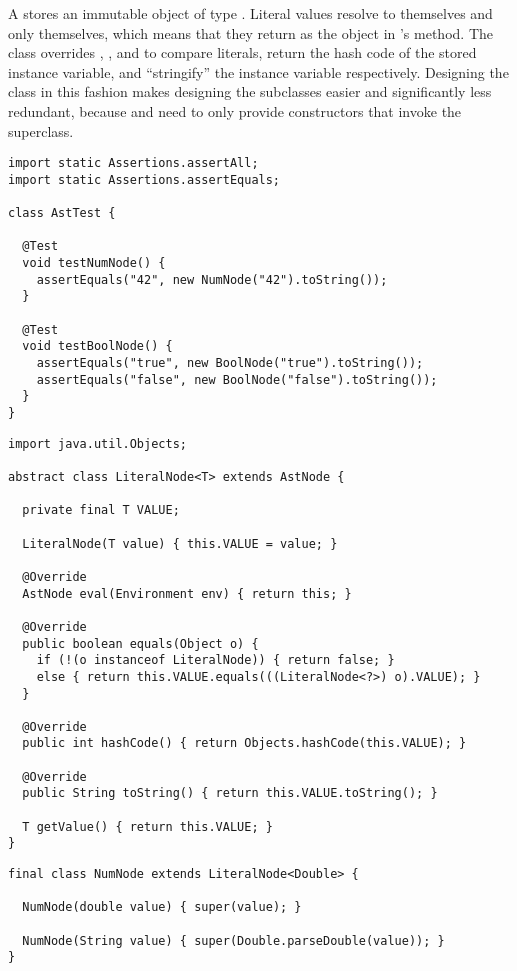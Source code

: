 A  stores an immutable object of type .
Literal values resolve to themselves and only themselves, which means that they return  as the object in 's  method.
The  class overrides , , and  to compare literals, return the hash code of the stored instance variable, and ``stringify'' the instance variable respectively.
Designing the  class in this fashion makes designing the subclasses easier and significantly less redundant, because  and  need to only provide constructors that invoke the superclass.

\enlargethispage{-5\baselineskip}
\begin{lstlisting}[language=MyJava]
import static Assertions.assertAll;
import static Assertions.assertEquals;

class AstTest {

  @Test
  void testNumNode() {
    assertEquals("42", new NumNode("42").toString());
  }

  @Test
  void testBoolNode() {
    assertEquals("true", new BoolNode("true").toString());
    assertEquals("false", new BoolNode("false").toString());
  }  
}
\end{lstlisting}

\begin{lstlisting}[language=MyJava]
import java.util.Objects;

abstract class LiteralNode<T> extends AstNode {

  private final T VALUE;

  LiteralNode(T value) { this.VALUE = value; }

  @Override
  AstNode eval(Environment env) { return this; }

  @Override
  public boolean equals(Object o) {
    if (!(o instanceof LiteralNode)) { return false; } 
    else { return this.VALUE.equals(((LiteralNode<?>) o).VALUE); }
  }

  @Override
  public int hashCode() { return Objects.hashCode(this.VALUE); }

  @Override
  public String toString() { return this.VALUE.toString(); }

  T getValue() { return this.VALUE; }
}
\end{lstlisting}

\begin{lstlisting}[language=MyJava]
final class NumNode extends LiteralNode<Double> {

  NumNode(double value) { super(value); }

  NumNode(String value) { super(Double.parseDouble(value)); }
}
\end{lstlisting}

